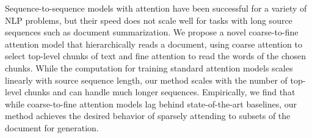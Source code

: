 Sequence-to-sequence models with attention have been successful for a variety of NLP problems, but their speed does not scale well for tasks with long source sequences such as document summarization. We propose a novel coarse-to-fine attention model that hierarchically reads a document, using coarse attention to select top-level chunks of text and fine attention to read the words of the chosen chunks. While the computation for training standard attention models scales linearly with source sequence length, our method scales with the number of top-level chunks and can handle much longer sequences. Empirically, we find that while coarse-to-fine attention models lag behind state-of-the-art baselines, our method achieves the desired behavior of sparsely attending to subsets of the document for generation.
